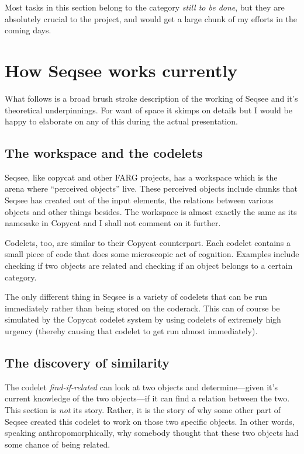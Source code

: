 \documentclass[letterpaper]{article}
\begin{document}
Most tasks in this section belong to the category \emph{still to be done}, but they are absolutely crucial to the project, and would get a large chunk of my efforts in the coming days.



\section{How Seqsee works currently}
\label{sec:how}

What follows is a broad brush stroke description of the working of Seqsee and it's theoretical underpinnings.  For want of space it skimps on details but I would be happy to elaborate on any of this during the actual presentation.

\subsection{The workspace and the codelets}

Seqsee, like copycat and other FARG projects, has a workspace which is the arena where ``perceived objects'' live.  These perceived objects include chunks that Seqsee has created out of the input elements, the relations between various objects and other things besides.  The workspace is almost exactly the same as its namesake in Copycat and I shall not comment on it further.

Codelets, too, are similar to their Copycat counterpart. Each codelet contains a small piece of code that does some microscopic act of cognition.  Examples include checking if two objects are related and checking if an object belongs to a certain category.

The only different thing in Seqsee is a variety of codelets that can be run immediately rather than being stored on the coderack.  This can of course be simulated by the Copycat codelet system by using codelets of extremely high urgency (thereby causing that codelet to get run almost immediately).

\subsection{The discovery of similarity}

The codelet \emph{find-if-related} can look at two objects and determine---given it's current knowledge of the two objects---if it can find a relation between the two.  This section is \emph{not} its story.  Rather, it is the story of why some other part of Seqsee created this codelet to work on those two specific objects.  In other words, speaking anthropomorphically, why somebody thought that these two objects had some chance of being related.
\end{document}
